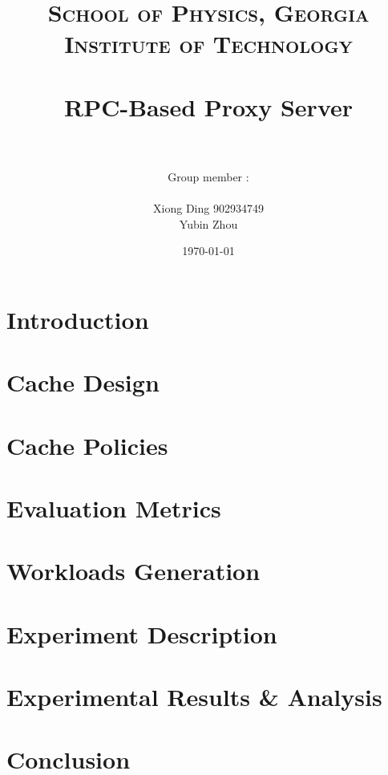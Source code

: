 \documentclass[paper=a4, fontsize=11pt]{scrartcl} %
\title{	
\normalfont \normalsize 
\textsc{School of Physics, Georgia Institute of Technology } \\ [25pt] %
\horrule{0.5pt} \\[0.4cm] %
\huge RPC-Based Proxy Server \\ %
\horrule{2pt} \\[0.5cm] %
}
\author{Group member : \\
\\
 Xiong Ding 902934749 \\ 
 Yubin Zhou
} %
\date{\normalsize\today} %
\numberwithin{equation}{section} %
\numberwithin{figure}{section} %
\numberwithin{table}{section} %
\begin{document}
\maketitle %


\section{Introduction}

\section{Cache Design}


\section{Cache Policies }

\section{Evaluation Metrics}

\section{Workloads Generation}

\section{Experiment Description}

\section{Experimental Results \& Analysis}

\section{Conclusion}
\end{document}

